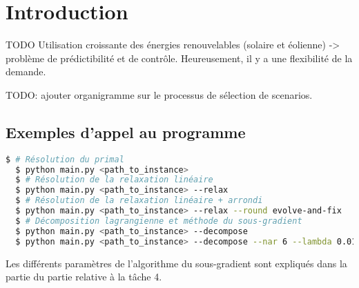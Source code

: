 \chapter{Introduction}
\vspace*{1.2cm}

TODO Utilisation croissante des énergies renouvelables (solaire et éolienne) 
-> problème de prédictibilité et de contrôle. 
Heureusement, il y a une flexibilité de la demande.

TODO: ajouter organigramme sur le processus de sélection de scenarios.

\section{Exemples d'appel au programme}

\begin{lstlisting}[language=bash]
  $ # Résolution du primal
  $ python main.py <path_to_instance>
  $ # Résolution de la relaxation linéaire
  $ python main.py <path_to_instance> --relax
  $ # Résolution de la relaxation linéaire + arrondi
  $ python main.py <path_to_instance> --relax --round evolve-and-fix
  $ # Décomposition lagrangienne et méthode du sous-gradient
  $ python main.py <path_to_instance> --decompose
  $ python main.py <path_to_instance> --decompose --nar 6 --lambda 0.01 --epsilon 0.01 --alpha0 2000
\end{lstlisting}

Les différents paramètres de l'algorithme du sous-gradient sont expliqués dans la partie du partie
relative à la tâche 4.